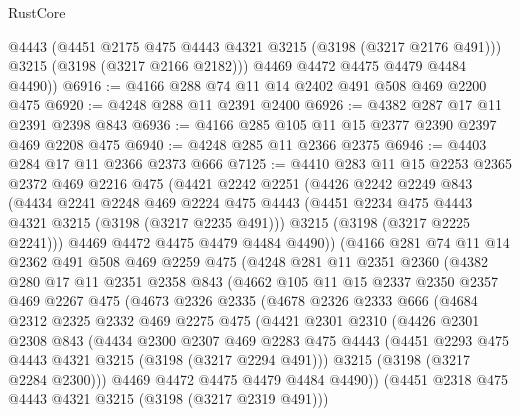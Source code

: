 \begin{lexlean}{RustCore}
\begin{coremodule}
          @4443
          (@4451 @2175 @475 @4443 @4321 @3215 (@3198 (@3217 @2176 @491)))
          @3215
          (@3198 (@3217 @2166 @2182)))
        @4469
        @4472
        @4475
        @4479
        @4484
        @4490))
@6916 := @4166 @288 @74 @11 @14 @2402 @491 @508 @469 @2200 @475
@6920 := @4248 @288 @11 @2391 @2400
@6926 := @4382 @287 @17 @11 @2391 @2398 @843
@6936 := @4166 @285 @105 @11 @15 @2377 @2390 @2397 @469 @2208 @475
@6940 := @4248 @285 @11 @2366 @2375
@6946 := @4403 @284 @17 @11 @2366 @2373 @666
@7125 := @4410
    @283
    @11
    @15
    @2253
    @2365
    @2372
    @469
    @2216
    @475
    (@4421
      @2242
      @2251
      (@4426
        @2242
        @2249
        @843
        (@4434
          @2241
          @2248
          @469
          @2224
          @475
          @4443
          (@4451 @2234 @475 @4443 @4321 @3215 (@3198 (@3217 @2235 @491)))
          @3215
          (@3198 (@3217 @2225 @2241)))
        @4469
        @4472
        @4475
        @4479
        @4484
        @4490))
    (@4166
      @281
      @74
      @11
      @14
      @2362
      @491
      @508
      @469
      @2259
      @475
      (@4248
        @281
        @11
        @2351
        @2360
        (@4382
          @280
          @17
          @11
          @2351
          @2358
          @843
          (@4662
            @105
            @11
            @15
            @2337
            @2350
            @2357
            @469
            @2267
            @475
            (@4673
              @2326
              @2335
              (@4678
                @2326
                @2333
                @666
                (@4684
                  @2312
                  @2325
                  @2332
                  @469
                  @2275
                  @475
                  (@4421
                    @2301
                    @2310
                    (@4426
                      @2301
                      @2308
                      @843
                      (@4434
                        @2300
                        @2307
                        @469
                        @2283
                        @475
                        @4443
                        (@4451 @2293 @475 @4443 @4321 @3215 (@3198 (@3217 @2294 @491)))
                        @3215
                        (@3198 (@3217 @2284 @2300)))
                      @4469
                      @4472
                      @4475
                      @4479
                      @4484
                      @4490))
                  (@4451 @2318 @475 @4443 @4321 @3215 (@3198 (@3217 @2319 @491)))

\end{coremodule}
\end{lexlean}
